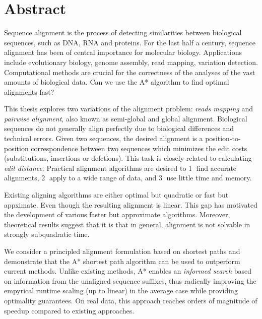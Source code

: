 \begingroup
\let\clearpage\relax
\let\cleardoublepage\relax
\let\cleardoublepage\relax

\chapter*{Abstract}

Sequence alignment is the process of detecting similarities between biological
sequences, such as DNA, RNA and proteins. For the last half a century, sequence
alignment has been of central importance for molecular biology. Applications
include evolutionary biology, genome assembly, read mapping, variation
detection. Computational methods are crucial for the correctness of the analyses
of the vast amounts of biological data. Can we use the A* algorithm to find
optimal alignments fast?

This thesis explores two variations of the alignment problem: \emph{reads
mapping} and \emph{pairwise alignment}, also known as semi-global and global
alignment. Biological sequences do not generally align perfectly due to
biological differences and technical errors. Given two sequences, the desired
alignment is a position-to-position correspondence between two sequences which
minimizes the edit costs (substitutions, insertions or deletions). This task is
closely related to calculating \emph{edit distance}. Practical alignment
algorithms are desired to \textcircled{1} find accurate alignments,
\textcircled{2} apply to a wide range of data, and \textcircled{3} use little
time and memory.

Existing aligning algorithms are either optimal but quadratic or fast but
appximate. Even though the resulting alignment is linear. This gap has motivated
the development of various faster but approximate algorithms. Moreover,
theoretical results suggest that it is that in general, alignment is not
solvable in strongly subquadratic time.

We consider a principled alignment formulation based on shortest paths and
demonstrate that the A* shortest path algorithm can be used to outperform
current methods. Unlike existing methods, A* enables an \emph{informed search}
based on information from the unaligned sequence suffixes, thus radically
improving the empyrical runtime scaling (up to linear) in the average case while
providing optimality guarantees. On real data, this approach reaches orders of
magnitude of speedup compared to existing approaches.

